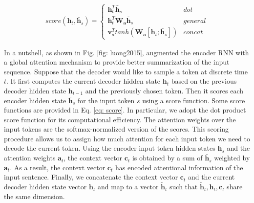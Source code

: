 \small
\begin{align}
    score(\bm{h}_t, \bm{\bar h}_s) =
  \begin{cases}
        \bm{h}_t^T \bm{\bar h}_s & dot \\
        \bm{h}_t^T \bm{W_a} \bm{\bar h}_s & general \\
        \bm{v}_a^T tanh(\bm{W_a} [\bm{h}_t;\bm{\bar h}_s]) & concat 
  \end{cases}
  \label{eq: score}
\end{align}
\normalsize

In a nutshell, as shown in Fig. \ref{fig: luong2015}, \cite{luong2015effective} augmented the encoder RNN with a global attention mechanism to provide better summarization of the input sequence. Suppose that the decoder would like to sample a token at discrete time $t$. It first computes the current decoder hidden state $\bm{h}_t$ based on the previous decoder hidden state $\bm{h}_{t-1}$ and the previously chosen token. Then it scores each encoder hidden state $\bm{\bar h}_s$ for the input token $s$ using a score function. Some score functions are provided in Eq. \ref{eq: score}. In particular, we adopt the dot product score function for its computational efficiency. The attention weights over the input tokens are the softmax-normalized version of the scores. This scoring procedure allows us to assign how much attention for each input token we need to decode the current token. Using the encoder input token hidden states $\bm{\bar h}_s$ and the attention weights $\bm{a}_t$, the context vector $\bm{c}_t$ is obtained by a sum of $\bm{\bar h}_s$ weighted by $\bm{a}_t$. As a result, the context vector $\bm{c}_t$ has encoded attentional information of the input sentence. Finally, we concatenate the context vector $\bm{c}_t$ and the current decoder hidden state vector $\bm{h}_t$ and map to a vector $\bm{\tilde h}_t$ such that $\bm{\tilde h}_t, \bm{h}_t, \bm{c}_t$ share the same dimension.


